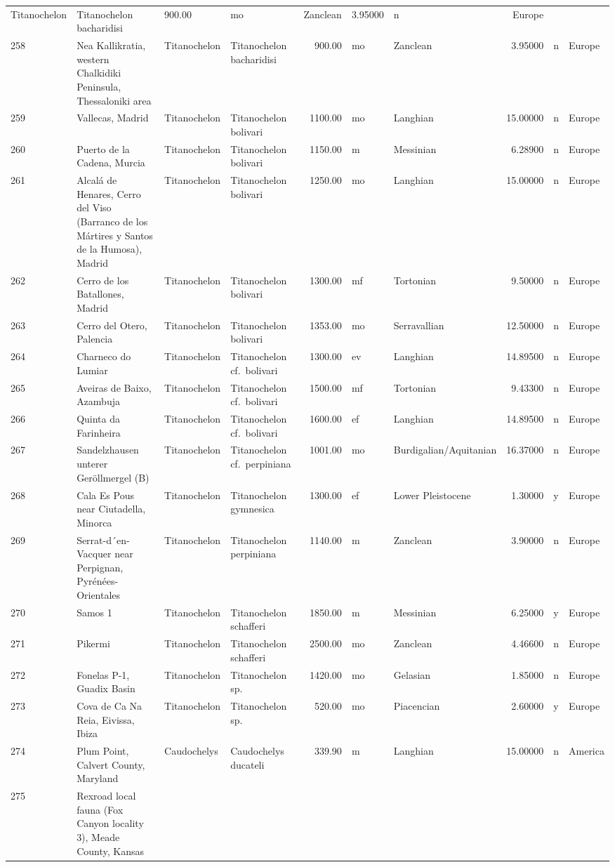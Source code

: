 \documentclass[]{article}
\begin{document}
\begin{longtable}[]{@{}llllrllrll@{}}
Titanochelon & Titanochelon bacharidisi & 900.00 & mo & Zanclean &
3.95000 & n & Europe\tabularnewline
258 & Nea Kallikratia, western Chalkidiki Peninsula, Thessaloniki area &
Titanochelon & Titanochelon bacharidisi & 900.00 & mo & Zanclean &
3.95000 & n & Europe\tabularnewline
259 & Vallecas, Madrid & Titanochelon & Titanochelon bolivari & 1100.00
& mo & Langhian & 15.00000 & n & Europe\tabularnewline
260 & Puerto de la Cadena, Murcia & Titanochelon & Titanochelon bolivari
& 1150.00 & m & Messinian & 6.28900 & n & Europe\tabularnewline
261 & Alcalá de Henares, Cerro del Viso (Barranco de los Mártires y
Santos de la Humosa), Madrid & Titanochelon & Titanochelon bolivari &
1250.00 & mo & Langhian & 15.00000 & n & Europe\tabularnewline
262 & Cerro de los Batallones, Madrid & Titanochelon & Titanochelon
bolivari & 1300.00 & mf & Tortonian & 9.50000 & n &
Europe\tabularnewline
263 & Cerro del Otero, Palencia & Titanochelon & Titanochelon bolivari &
1353.00 & mo & Serravallian & 12.50000 & n & Europe\tabularnewline
264 & Charneco do Lumiar & Titanochelon & Titanochelon cf.~bolivari &
1300.00 & ev & Langhian & 14.89500 & n & Europe\tabularnewline
265 & Aveiras de Baixo, Azambuja & Titanochelon & Titanochelon
cf.~bolivari & 1500.00 & mf & Tortonian & 9.43300 & n &
Europe\tabularnewline
266 & Quinta da Farinheira & Titanochelon & Titanochelon cf.~bolivari &
1600.00 & ef & Langhian & 14.89500 & n & Europe\tabularnewline
267 & Sandelzhausen unterer Geröllmergel (B) & Titanochelon &
Titanochelon cf.~perpiniana & 1001.00 & mo & Burdigalian/Aquitanian &
16.37000 & n & Europe\tabularnewline
268 & Cala Es Pous near Ciutadella, Minorca & Titanochelon &
Titanochelon gymnesica & 1300.00 & ef & Lower Pleistocene & 1.30000 & y
& Europe\tabularnewline
269 & Serrat-d´en-Vacquer near Perpignan, Pyrénées-Orientales &
Titanochelon & Titanochelon perpiniana & 1140.00 & m & Zanclean &
3.90000 & n & Europe\tabularnewline
270 & Samos 1 & Titanochelon & Titanochelon schafferi & 1850.00 & m &
Messinian & 6.25000 & y & Europe\tabularnewline
271 & Pikermi & Titanochelon & Titanochelon schafferi & 2500.00 & mo &
Zanclean & 4.46600 & n & Europe\tabularnewline
272 & Fonelas P-1, Guadix Basin & Titanochelon & Titanochelon sp. &
1420.00 & mo & Gelasian & 1.85000 & n & Europe\tabularnewline
273 & Cova de Ca Na Reia, Eivissa, Ibiza & Titanochelon & Titanochelon
sp. & 520.00 & mo & Piacencian & 2.60000 & y & Europe\tabularnewline
274 & Plum Point, Calvert County, Maryland & Caudochelys & Caudochelys
ducateli & 339.90 & m & Langhian & 15.00000 & n & America\tabularnewline
275 & Rexroad local fauna (Fox Canyon locality 3), Meade County, Kansas

\end{longtable}
\end{document}

